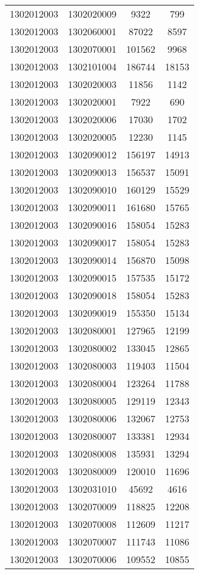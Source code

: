 \begin{longtable}{llcc}
1302012003 & 1302020009 & 9322 & 799\\
1302012003 & 1302060001 & 87022 & 8597\\
1302012003 & 1302070001 & 101562 & 9968\\
1302012003 & 1302101004 & 186744 & 18153\\
1302012003 & 1302020003 & 11856 & 1142\\
1302012003 & 1302020001 & 7922 & 690\\
1302012003 & 1302020006 & 17030 & 1702\\
1302012003 & 1302020005 & 12230 & 1145\\
1302012003 & 1302090012 & 156197 & 14913\\
1302012003 & 1302090013 & 156537 & 15091\\
1302012003 & 1302090010 & 160129 & 15529\\
1302012003 & 1302090011 & 161680 & 15765\\
1302012003 & 1302090016 & 158054 & 15283\\
1302012003 & 1302090017 & 158054 & 15283\\
1302012003 & 1302090014 & 156870 & 15098\\
1302012003 & 1302090015 & 157535 & 15172\\
1302012003 & 1302090018 & 158054 & 15283\\
1302012003 & 1302090019 & 155350 & 15134\\
1302012003 & 1302080001 & 127965 & 12199\\
1302012003 & 1302080002 & 133045 & 12865\\
1302012003 & 1302080003 & 119403 & 11504\\
1302012003 & 1302080004 & 123264 & 11788\\
1302012003 & 1302080005 & 129119 & 12343\\
1302012003 & 1302080006 & 132067 & 12753\\
1302012003 & 1302080007 & 133381 & 12934\\
1302012003 & 1302080008 & 135931 & 13294\\
1302012003 & 1302080009 & 120010 & 11696\\
1302012003 & 1302031010 & 45692 & 4616\\
1302012003 & 1302070009 & 118825 & 12208\\
1302012003 & 1302070008 & 112609 & 11217\\
1302012003 & 1302070007 & 111743 & 11086\\
1302012003 & 1302070006 & 109552 & 10855\\

\end{longtable}
